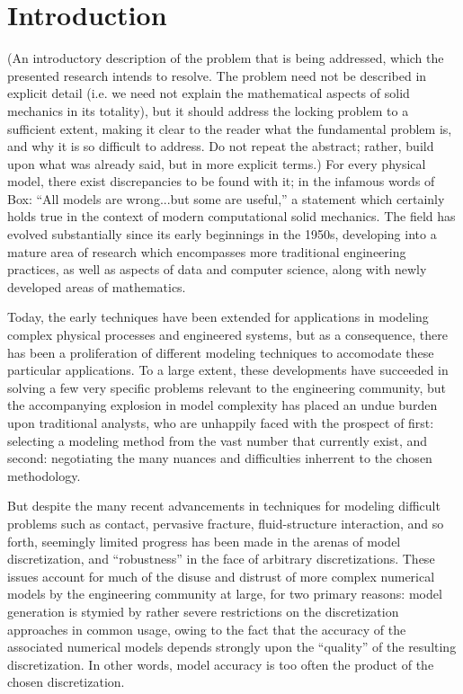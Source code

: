 \chapter{Introduction}
%
(An introductory description of the problem that is being addressed, which the presented research intends to resolve. The problem need not be described in explicit detail (i.e. we need not explain the mathematical aspects of solid mechanics in its totality), but it should address the locking problem to a sufficient extent, making it clear to the reader what the fundamental problem is, and why it is so difficult to address. Do not repeat the abstract; rather, build upon what was already said, but in more explicit terms.)
%
For every physical model, there exist discrepancies to be found with it; in the infamous words of Box: ``All models are wrong...but some are useful,'' a statement which certainly holds true in the context of modern computational solid mechanics. The field has evolved substantially since its early beginnings in the 1950s, developing into a mature area of research which encompasses more traditional engineering practices, as well as aspects of data and computer science, along with newly developed areas of mathematics.

Today, the early techniques have been extended for applications in modeling complex physical processes and engineered systems, but as a consequence, there has been a proliferation of different modeling techniques to accomodate these particular applications. To a large extent, these developments have succeeded in solving a few very specific problems relevant to the engineering community, but the accompanying explosion in model complexity has placed an undue burden upon traditional analysts, who are unhappily faced with the prospect of first: selecting a modeling method from the vast number that currently exist, and second: negotiating the many nuances and difficulties inherrent to the chosen methodology.

But despite the many recent advancements in techniques for modeling difficult problems such as contact, pervasive fracture, fluid-structure interaction, and so forth, seemingly limited progress has been made in the arenas of model discretization, and ``robustness'' in the face of arbitrary discretizations. These issues account for much of the disuse and distrust of more complex numerical models by the engineering community at large, for two primary reasons: model generation is stymied by rather severe restrictions on the discretization approaches in common usage, owing to the fact that the accuracy of the associated numerical models depends strongly upon the ``quality'' of the resulting discretization. In other words, model accuracy is too often the product of the chosen discretization.

